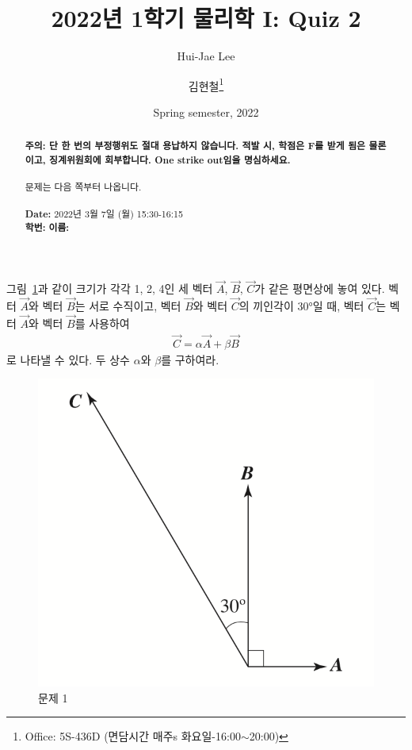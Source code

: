 \documentclass[APS,floatfix,nofootinbib,superscriptaddress,fleqn,preprint]{revtex4}
\begin{document}
\title{\Large 2022년 1학기 물리학 I: Quiz 2}
\author{Hui-Jae Lee} 
\author{김현철\footnote{Office: 5S-436D (면담시간 매주s
    화요일-16:00$\sim$20:00)}} 
\date{Spring semester, 2022}


\vspace{1.cm}
\begin{abstract}
\noindent \textbf{ {\color{red}주의}: \color{blue} 단 한 번의 부정행위도 절대
  용납하지 않습니다. 적발 시, 학점은 F를 받게 됨은 물론이고,
  징계위원회에 회부합니다. One strike out임을 명심하세요.}\\
\\
문제는 다음 쪽부터 나옵니다.  \\ \\
{\bf Date:} 2022년 3월 7일 (월) 15:30-16:15 
\\
{\bf 학번:} \hspace{4cm}
{\bf 이름:} 

\end{abstract}
\maketitle

그림~\ref{fig:1}과 같이 크기가 각각 1, 2, 4인 세 벡터 $\vec{A}$,
$\vec{B}$, $\vec{C}$가 같은 평면상에 놓여 있다. 벡터 $\vec{A}$와 벡터
$\vec{B}$는 서로 수직이고, 벡터 $\vec{B}$와 벡터 $\vec{C}$의 끼인각이 30°일 때,
벡터 $\vec{C}$는 벡터 $\vec{A}$와 벡터 $\vec{B}$를 사용하여
\begin{align*}
\vec{C} = \alpha \vec{A} + \beta\vec{B}  
\end{align*}
로 나타낼 수 있다. 두 상수 $\alpha$와 $\beta$를 구하여라. 
\begin{figure}[ht]
  \centering
\includegraphics[scale=0.6]{Qfig3-1-20220307.png}  
  \caption{문제 1}
  \label{fig:1}
\end{figure} 
\end{document}
